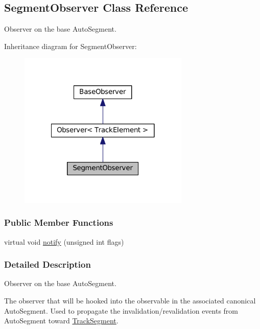 \hypertarget{classKite_1_1SegmentObserver}{}\subsection{Segment\+Observer Class Reference}
\label{classKite_1_1SegmentObserver}


Observer on the base Auto\+Segment.  




Inheritance diagram for Segment\+Observer\+:\nopagebreak
\begin{figure}[H]
\begin{center}
\leavevmode
\includegraphics[width=230pt]{classKite_1_1SegmentObserver__inherit__graph}
\end{center}
\end{figure}
\subsubsection*{Public Member Functions}
\begin{DoxyCompactItemize}
\item 
virtual void \mbox{\hyperlink{classKite_1_1SegmentObserver_a52e577fb0c4f2e3650928334fb621c2f}{notify}} (unsigned int flags)
\end{DoxyCompactItemize}


\subsubsection{Detailed Description}
Observer on the base Auto\+Segment. 

The observer that will be hooked into the observable in the associated canonical Auto\+Segment. Used to propagate the invalidation/revalidation events from Auto\+Segment toward \mbox{\hyperlink{classKite_1_1TrackSegment}{Track\+Segment}}.

